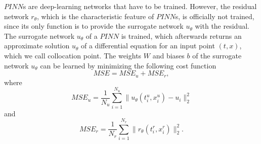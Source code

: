 $PINN$s are deep-learning networks that have to be trained. However, the residual network $r_\theta$, which is the characteristic feature of $PINN$s, is officially not trained, since its only function is to provide the surrogate network $u_\theta$ with the residual. The surrogate network $u_\theta$ of a $PINN$ is trained, which afterwards returns an approximate solution $u_\theta$ of a differential equation for an input point $\left(t,x\right)$, which we call collocation point. The weights $W$ and biases $b$ of the surrogate network $u_\theta$ can be learned by minimizing the following cost function
\begin{equation}
    \label{MSE pinn}
    MSE = MSE_u + MSE_r, 
\end{equation}
where
\begin{equation*}
    MSE_u = \frac{1}{N_u} \sum^{N_u}_{i = 1} \lVert u_\theta\left(t^{u}_i, x^{u}_i\right) - u_i \rVert^{2}_{2}
\end{equation*}
and
\begin{equation*}
    MSE_r = \frac{1}{N_r} \sum^{N_r}_{i = 1} \lVert r_\theta \left(t^{r}_i, x^{r}_i\right) \rVert^{2}_{2}.
\end{equation*}
